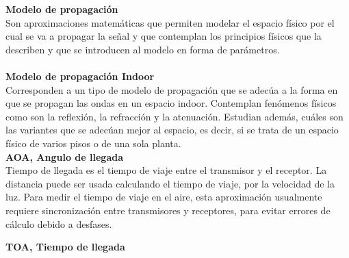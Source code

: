\textbf{Modelo de propagación}\\

Son aproximaciones matemáticas que permiten modelar el espacio físico por el cual se va a propagar la señal y que contemplan los principios físicos que la describen y que se introducen al modelo en forma de parámetros.\\\\


\textbf{Modelo de propagación Indoor}\\

Corresponden a un tipo de modelo de propagación que se adecúa a la forma en que se propagan las ondas en un espacio indoor. Contemplan fenómenos físicos como son la reflexión, la refracción y la atenuación. Estudian además, cuáles son las variantes que se adecúan mejor al espacio, es decir, si se trata de un espacio físico de varios 
pisos o de una sola planta.\\

\textbf{AOA, Angulo de llegada}\\

Tiempo de llegada es el tiempo de viaje entre el transmisor y el receptor. La distancia puede ser usada calculando el tiempo de viaje, por la velocidad de la luz. Para medir el tiempo de viaje en el aire, esta aproximación usualmente requiere sincronización entre transmisores y receptores, para evitar errores de cálculo debido a desfases.


\textbf{TOA, Tiempo de llegada}\\


